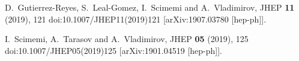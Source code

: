 \documentclass[prd,nofootinbib,eqsecnum,final]{revtex4}
\renewcommand{\(}{\left(}
\renewcommand{\)}{\right)}
\renewcommand{\[}{\left[}
\renewcommand{\]}{\right]}
\begin{document}
\begin{thebibliography}{10}
D.~Gutierrez-Reyes, S.~Leal-Gomez, I.~Scimemi and A.~Vladimirov,
JHEP \textbf{11} (2019), 121
doi:10.1007/JHEP11(2019)121
[arXiv:1907.03780 [hep-ph]].

I.~Scimemi, A.~Tarasov and A.~Vladimirov,
JHEP \textbf{05} (2019), 125
doi:10.1007/JHEP05(2019)125
[arXiv:1901.04519 [hep-ph]].

\end{thebibliography}

\newpage
\end{document}
